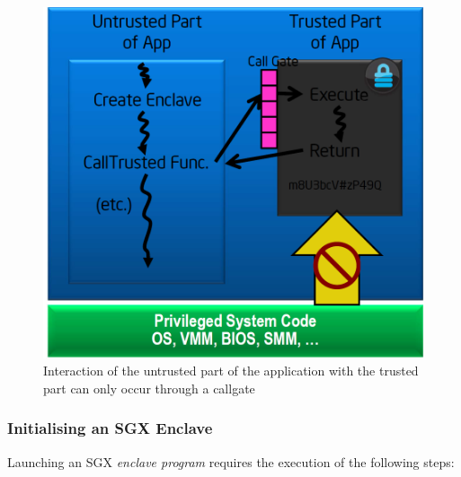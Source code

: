 \documentclass[../main.tex]{subfiles}
\begin{document}
\begin{figure}[H]
  \centering
  \includegraphics[scale=0.25]{images/sgxhighlevel.png}
  \caption{Interaction of the untrusted part of the application with
    the trusted part can only occur through a
    callgate~\cite{IntelCorporation2010}}
  \label{fig:sgxhighlevel}
\end{figure}

\subsubsection{Initialising an SGX Enclave}

Launching an SGX \textit{enclave program} requires the execution of
the following steps:
\end{document}

